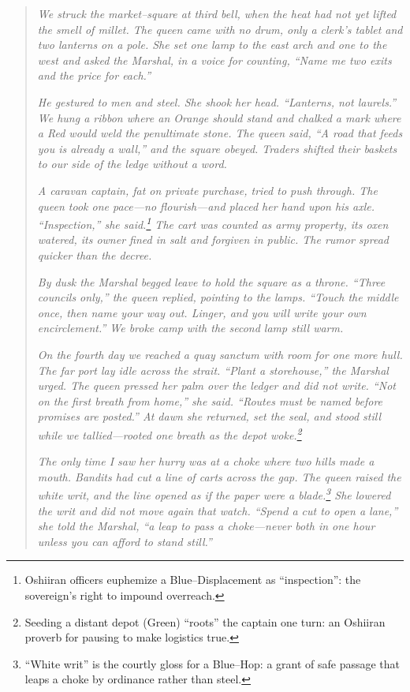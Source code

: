 \documentclass[11pt]{article}
\begin{document}
\begin{quote}\small
\emph{We struck the market–square at third bell, when the heat had not yet lifted the smell of millet. The queen came with no drum, only a clerk’s tablet and two lanterns on a pole. She set one lamp to the east arch and one to the west and asked the Marshal, in a voice for counting, “Name me two exits and the price for each.”}

\emph{He gestured to men and steel. She shook her head. “Lanterns, not laurels.” We hung a ribbon where an Orange should stand and chalked a mark where a Red would weld the penultimate stone. The queen said, “A road that feeds you is already a wall,” and the square obeyed. Traders shifted their baskets to our side of the ledge without a word.}

\emph{A caravan captain, fat on private purchase, tried to push through. The queen took one pace—no flourish—and placed her hand upon his axle. “\textit{Inspection},” she said.\footnote{Oshiiran officers euphemize a Blue–Displacement as “inspection”: the sovereign’s right to impound overreach.} The cart was counted as army property, its oxen watered, its owner fined in salt and forgiven in public. The rumor spread quicker than the decree.}

\emph{By dusk the Marshal begged leave to hold the square as a throne. “Three councils only,” the queen replied, pointing to the lamps. “Touch the middle once, then name your way out. Linger, and you will write your own encirclement.” We broke camp with the second lamp still warm.}

\emph{On the fourth day we reached a quay sanctum with room for one more hull. The far port lay idle across the strait. “Plant a storehouse,” the Marshal urged. The queen pressed her palm over the ledger and did not write. “Not on the first breath from home,” she said. “Routes must be named before promises are posted.” At dawn she returned, set the seal, and stood still while we tallied—rooted one breath as the depot woke.\footnote{Seeding a distant depot (Green) “roots” the captain one turn: an Oshiiran proverb for pausing to make logistics true.}}

\emph{The only time I saw her hurry was at a choke where two hills made a mouth. Bandits had cut a line of carts across the gap. The queen raised the white writ, and the line opened as if the paper were a blade.\footnote{“White writ” is the courtly gloss for a Blue–Hop: a grant of safe passage that leaps a choke by ordinance rather than steel.} She lowered the writ and did not move again that watch. “Spend a cut to open a lane,” she told the Marshal, “a leap to pass a choke—never both in one hour unless you can afford to stand still.”}


\end{quote}
\end{document}
